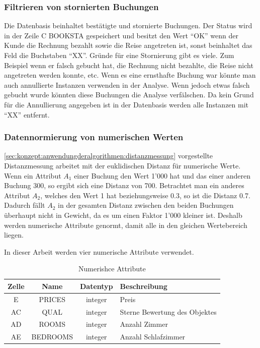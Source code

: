 \subsubsection{Filtrieren von stornierten Buchungen}
\label{sec:recherche:datenvorbereitung:filtrieren}
Die Datenbasis beinhaltet bestätigte und stornierte Buchungen. Der Status wird in der Zeile C BOOKSTA gespeichert und besitzt den Wert "`OK"' wenn der Kunde die Rechnung bezahlt sowie die Reise angetreten ist, sonst beinhaltet das Feld die Buchstaben "`XX"'. Gründe für eine Stornierung gibt es viele. Zum Beispiel wenn er falsch gebucht hat, die Rechnung nicht bezahlte, die Reise nicht angetreten werden konnte, etc. Wenn es eine ernsthafte Buchung war könnte man auch annullierte Instanzen verwenden in der Analyse. Wenn jedoch etwas falsch gebucht wurde könnten diese Buchungen die Analyse verfälschen. Da kein Grund für die Annullierung angegeben ist in der Datenbasis werden alle Instanzen mit "`XX"' entfernt. 

\subsubsection{Datennormierung von numerischen Werten} 
\label{sec:recherche:datenvorbereitung:normierung} \cref{sec:konzept:anwendungderalgorithmen:distanzmessung} vorgestellte Distanzmessung arbeitet mit der euklidischen Distanz für numerische Werte. Wenn ein Attribut $A_1$ einer Buchung den Wert 1'000 hat und das einer anderen Buchung 300, so ergibt sich eine Distanz von 700. Betrachtet man ein anderes Attribut $A_2$, welches den Wert 1 hat beziehungsweise 0.3, so ist die Distanz 0.7. Dadurch fällt $A_2$ in der gesamten Distanz zwischen den beiden Buchungen überhaupt nicht in Gewicht, da es um einen Faktor 1'000 kleiner ist. Deshalb werden numerische Attribute genormt, damit alle in den gleichen Wertebereich liegen.

In dieser Arbeit werden vier numerische Attribute verwendet.
\begin{table}[H] 
	\caption{Numerishce Attribute}
	\centering
	\label{fig:recherche:datenvorbereitung:5}
	\begin{tabular}{ | c | c | c | l | } 
		\hline 
		\rowcolor{tableheadcolor}
		\bfseries Zelle & \bfseries Name & \bfseries Datentyp & \bfseries Beschreibung \\ \hline 
		E & PRICES & integer & Preis \\ \hline 
		AC & QUAL & integer & Sterne Bewertung des Objektes \\ \hline 
		AD & ROOMS & integer & Anzahl Zimmer \\ \hline 
		AE & BEDROOMS & integer & Anzahl Schlafzimmer \\ \hline 
	\end{tabular}
\end{table}

